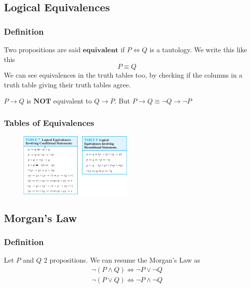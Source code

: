 \documentclass{article}
\begin{document}
\subsection{Logical Equivalences}
\subsubsection{Definition}
Two propositions are said $ \textbf{equivalent} $ if $ P \Leftrightarrow Q $ is a tautology. We write this like this
\begin{equation}
P \equiv Q
\end{equation}
We can see equivalences in the truth tables too, by checking if the columns in a truth table giving their truth tables agree.

\begin{tcolorbox}[width=12.1cm, leftrule=3mm]
$ P \rightarrow Q $ is $ \textbf{NOT} $ equivalent to $ Q \rightarrow P $. But $ P \rightarrow Q \equiv \neg Q \rightarrow \neg P $
\end{tcolorbox}

\subsubsection{Tables of Equivalences}
\begin{figure}[h]
  \hfill\includegraphics[width=0.5\textwidth]{equiv.png}\hspace*{\fill}
  \label{fig:equiv}
\end{figure}  

\subsection{Morgan's Law}
\subsubsection{Definition} 
Let $ P $ and $ Q $ 2 propositions. We can resume the Morgan's Law as
\begin{align}
\neg (P \wedge Q) \Leftrightarrow \neg P \vee \neg Q\\
\neg (P \vee Q) \Leftrightarrow \neg P \wedge \neg Q
\end{align}
\end{document}
